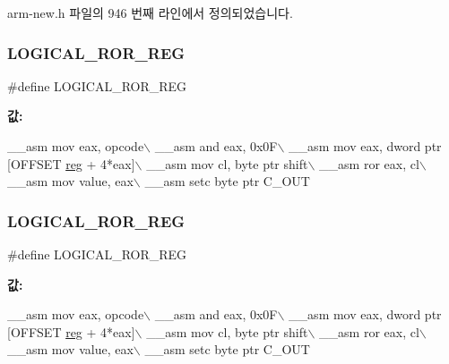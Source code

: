 arm-\/new.\+h 파일의 946 번째 라인에서 정의되었습니다.

\mbox{\label{_g_b_a_8cpp_afc0b39e8500e6fd7cbaa25e13026cc0e}} 
\subsubsection{\texorpdfstring{L\+O\+G\+I\+C\+A\+L\+\_\+\+R\+O\+R\+\_\+\+R\+EG}{LOGICAL\_ROR\_REG}\hspace{0.1cm}{\footnotesize\ttfamily [1/2]}}
{\footnotesize\ttfamily \#define L\+O\+G\+I\+C\+A\+L\+\_\+\+R\+O\+R\+\_\+\+R\+EG}

{\bfseries 값\+:}
\begin{DoxyCode}
\_\_asm mov eax, opcode\(\backslash\)
        \_\_asm and eax, 0x0F\(\backslash\)
        \_\_asm mov eax, dword ptr [OFFSET \mbox{\hyperlink{_g_b_a_8h_ae29faba89509024ffd1a292badcedf2d}{reg}} + 4*eax]\(\backslash\)
        \_\_asm mov cl, byte ptr shift\(\backslash\)
        \_\_asm ror eax, cl\(\backslash\)
        \_\_asm mov value, eax\(\backslash\)
        \_\_asm setc byte ptr C\_OUT
\end{DoxyCode}
\mbox{\label{arm-new_8h_afc0b39e8500e6fd7cbaa25e13026cc0e}} 
\subsubsection{\texorpdfstring{L\+O\+G\+I\+C\+A\+L\+\_\+\+R\+O\+R\+\_\+\+R\+EG}{LOGICAL\_ROR\_REG}\hspace{0.1cm}{\footnotesize\ttfamily [2/2]}}
{\footnotesize\ttfamily \#define L\+O\+G\+I\+C\+A\+L\+\_\+\+R\+O\+R\+\_\+\+R\+EG}

{\bfseries 값\+:}
\begin{DoxyCode}
\_\_asm mov eax, opcode\(\backslash\)
        \_\_asm and eax, 0x0F\(\backslash\)
        \_\_asm mov eax, dword ptr [OFFSET \mbox{\hyperlink{_g_b_a_8h_ae29faba89509024ffd1a292badcedf2d}{reg}} + 4*eax]\(\backslash\)
        \_\_asm mov cl, byte ptr shift\(\backslash\)
        \_\_asm ror eax, cl\(\backslash\)
        \_\_asm mov value, eax\(\backslash\)
        \_\_asm setc byte ptr C\_OUT
\end{DoxyCode}


